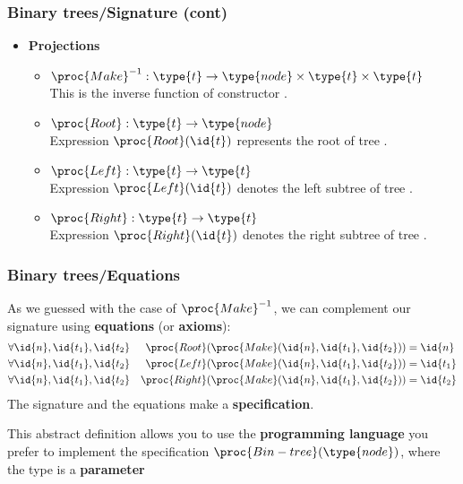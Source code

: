 %
\begin{frame}
\frametitle{Binary trees/Signature (cont)}

\begin{itemize}

  \item \textbf{Projections}
  
 \begin{itemize}

    \item \(\proc{Make}^{-1} : \type{t} \rightarrow \type{node}
    \times \type{t} \times \type{t}\)\\
    This is the inverse function of constructor .

    \item \(\proc{Root} : \type{t} \rightarrow
      \type{node}\)\\ Expression \(\proc{Root} (\id{t})\) represents
      the root of tree .

    \item \(\proc{Left} : \type{t} \rightarrow \type{t}\)\\ Expression
      \(\proc{Left} (\id{t})\) denotes the left subtree of tree
      .

    \item \(\proc{Right} : \type{t} \rightarrow \type{t}\)\\
    Expression \(\proc{Right} (\id{t})\) denotes the right subtree of
    tree .

 \end{itemize}

\end{itemize}

\end{frame}

%
\begin{frame}
\frametitle{Binary trees/Equations}

As we guessed with the case of \(\proc{Make}^{-1}\), we can complement
our signature using \textbf{equations} (or \textbf{axioms}):
\[
\begin{aligned}
&\forall \id{n}, \id{t_1}, \id{t_2} 
& \proc{Root}
  (\proc{Make} (\id{n}, \id{t_1}, \id{t_2})) &= \id{n}\\
&\forall \id{n}, \id{t_1}, \id{t_2}
& \proc{Left} (\proc{Make} (\id{n}, \id{t_1}, \id{t_2})) &= \id{t_1}\\
&\forall \id{n}, \id{t_1}, \id{t_2} 
& \proc{Right} (\proc{Make} (\id{n}, \id{t_1}, \id{t_2})) &= \id{t_2}
\end{aligned}
\]
The signature and the equations make a \textbf{specification}.

\bigskip

This abstract definition allows you to use the \textbf{programming
language} you prefer to implement the specification \(\proc{Bin-tree}
(\type{node})\), where the type  is a
\textbf{parameter}

\end{frame}

